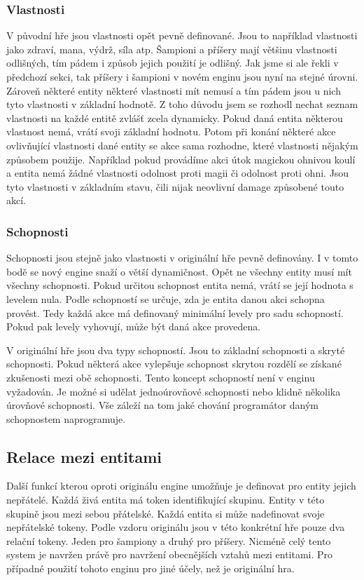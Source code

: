 \subsubsection{Vlastnosti}
V původní hře jsou vlastnosti opět pevně definované. Jsou to například vlastnosti jako zdraví, mana, výdrž, síla atp.
Šampioni a příšery mají většinu vlastnosti odlišných, tím pádem i způsob jejich použití je odlišný. Jak jsme si ale řekli v předchozí sekci,
tak příšery i šampioni v novém enginu jsou nyní na stejné úrovni. Zároveň některé entity některé vlastnosti mít nemusí a tím pádem jsou u nich 
tyto vlastnosti v základní hodnotě. Z toho důvodu jsem se rozhodl nechat seznam vlastnosti na každé entitě zvlášť zcela dynamicky.
Pokud daná entita některou vlastnost nemá, vrátí svoji základní hodnotu. Potom při konání některé akce ovlivňující vlastnosti dané entity se
 akce sama rozhodne, které vlastnosti nějakým způsobem použije. Například pokud provádíme akci útok magickou ohnivou koulí a entita nemá žádné vlastnosti 
 odolnost proti magii či odolnost proti ohni. Jsou tyto vlastnosti v základním stavu, čili nijak neovlivní damage způsobené touto akcí.

 \subsubsection{Schopnosti}
 Schopnosti jsou stejně jako vlastnosti v originální hře pevně definovány. I v tomto bodě se nový engine snaží o větší
 dynamičnost. Opět ne všechny entity musí mít všechny schopnosti. Pokud určitou schopnost entita nemá, vrátí se její hodnota s levelem nula.
 Podle schopností se určuje, zda je entita danou akci schopna provést. Tedy každá akce má definovaný minimální levely pro sadu schopností.
 Pokud pak levely vyhovují, může být daná akce provedena.

 V originální hře jsou dva typy schopností. Jsou to základní schopnosti a skryté schopnosti. Pokud některá akce vylepšuje schopnost skrytou
 rozdělí se získané zkušenosti mezi obě schopnosti. Tento koncept schopností není v enginu vyžadován. Je možné si udělat jednoúrovňové 
 schopnosti nebo klidně několika úrovňové schopnosti. Vše záleží na tom jaké chování programátor daným schopnostem naprogramuje. 

 \subsection{Relace mezi entitami}
 Další funkcí kterou oproti originálu engine umožňuje je definovat pro entity jejich nepřátelé. Každá živá entita má token identifikující
 skupinu. Entity v této skupině jsou mezi sebou přátelské. Každá entita si může nadefinovat svoje nepřátelské tokeny.
 Podle vzdoru originálu jsou v této konkrétní hře pouze dva relační tokeny. Jeden pro šampiony a druhý pro příšery. Nicméně
 celý tento system je navržen právě pro navržení obecnějších vztahů mezi entitami. Pro případné použití tohoto enginu pro jiné účely,
 než je originální hra.

